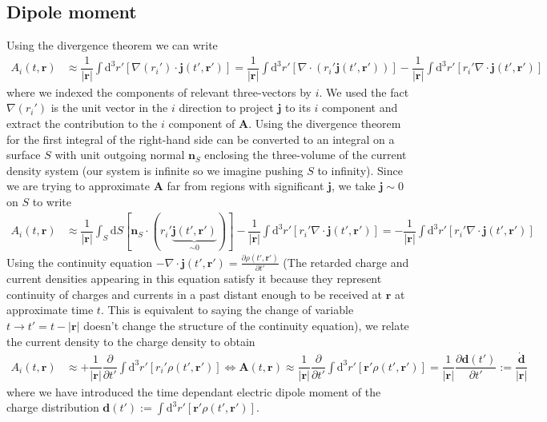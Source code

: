 \documentclass[10pt, a4paper]{article}
\begin{document}
{\subsection{Dipole moment}
Using the divergence theorem we can write 
\begin{align*}
    A_i(t, \mathbf{r}) &\approx \dfrac{1}{|\mathbf{r}|} \int \text{d}^3r' \left[\nabla(r_i') \cdot \mathbf{j}(t', \mathbf{r}')\right] = \dfrac{1}{|\mathbf{r}|} \int \text{d}^3r' \left[\nabla \cdot(r_i'  \mathbf{j}(t', \mathbf{r}'))\right]-\dfrac{1}{|\mathbf{r}|} \int \text{d}^3r' \left[r_i' \nabla \cdot \mathbf{j}(t', \mathbf{r}')\right]
\end{align*}
where we indexed the components of relevant three-vectors by $i$. We used the fact $\nabla(r_i')$ is the unit vector in the $i$ direction to project $\mathbf{j}$ to its $i$ component and extract the contribution to the $i$ component of $\mathbf{A}$. Using the divergence theorem for the first integral of the right-hand side can be converted to an integral on a surface $S$ with unit outgoing normal $\mathbf{n}_S$ enclosing the three-volume of the current density system (our system is infinite so we imagine pushing $S$ to infinity). Since we are trying to approximate $\mathbf{A}$ far from regions with significant $\mathbf{j}$, we take $\mathbf{j} \sim 0$ on $S$ to write 
\begin{align*}
    A_i(t, \mathbf{r}) &\approx \dfrac{1}{|\mathbf{r}|} \int_S \text{d}S [\mathbf{n}_S \cdot (r_i'  \underbrace{\mathbf{j}(t', \mathbf{r}')}_{\sim 0})]-\dfrac{1}{|\mathbf{r}|} \int \text{d}^3r' \left[r_i' \nabla \cdot \mathbf{j}(t', \mathbf{r}')\right] = -\dfrac{1}{|\mathbf{r}|} \int \text{d}^3r' \left[r_i' \nabla \cdot \mathbf{j}(t', \mathbf{r}')\right] 
\end{align*}
Using the continuity equation $-\nabla \cdot \mathbf{j}(t', \mathbf{r}') = \frac{\partial \rho(t', \mathbf{r}')}{\partial t'}$ (The retarded charge and current densities appearing in this equation satisfy it because they represent continuity of charges and currents in a past distant enough to be received at $\mathbf{r}$ at approximate time $t$. This is equivalent to saying the change of variable $t \to t' = t-|\mathbf{r}|$ doesn't change the structure of the continuity equation), we relate the current density to the charge density to obtain
\begin{align*}
    A_i(t, \mathbf{r}) &\approx +\dfrac{1}{|\mathbf{r}|} \dfrac{\partial}{\partial t'}\int \text{d}^3r' \left[r_i' \rho(t', \mathbf{r}')\right] \iff \mathbf{A}(t, \mathbf{r}) \approx \dfrac{1}{|\mathbf{r}|} \dfrac{\partial}{\partial t'}\int \text{d}^3r' \left[\mathbf{r}' \rho(t', \mathbf{r}')\right]= \dfrac{1}{|\mathbf{r}|}\dfrac{\partial\mathbf{d}(t')}{\partial t'} := \dfrac{\dot{\mathbf{d}}}{|\mathbf{r}|}
\end{align*}
where we have introduced the time dependant electric dipole moment of the charge distribution $\mathbf{d}(t') := \int \text{d}^3r' \left[\mathbf{r}' \rho(t', \mathbf{r}')\right]$.


}
\end{document}
